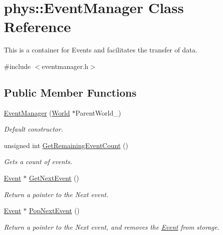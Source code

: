 \hypertarget{classphys_1_1EventManager}{
\section{phys::EventManager Class Reference}
\label{da/dde/classphys_1_1EventManager}
}


This is a container for Events and facilitates the transfer of data.  




{\ttfamily \#include $<$eventmanager.h$>$}

\subsection*{Public Member Functions}
\begin{DoxyCompactItemize}
\item 
\hyperlink{classphys_1_1EventManager_a148f8c559642d3d50206169b3d0406be}{EventManager} (\hyperlink{classphys_1_1World}{World} $\ast$ParentWorld\_\-)
\begin{DoxyCompactList}\small\item\em Default constructor. \item\end{DoxyCompactList}\item 
unsigned int \hyperlink{classphys_1_1EventManager_a67b755e3fe888e1305312d0f966f4a06}{GetRemainingEventCount} ()
\begin{DoxyCompactList}\small\item\em Gets a count of events. \item\end{DoxyCompactList}\item 
\hyperlink{classphys_1_1Event}{Event} $\ast$ \hyperlink{classphys_1_1EventManager_a4c11830094d6566fd5db87dfbe6b5dd0}{GetNextEvent} ()
\begin{DoxyCompactList}\small\item\em Return a pointer to the Next event. \item\end{DoxyCompactList}\item 
\hyperlink{classphys_1_1Event}{Event} $\ast$ \hyperlink{classphys_1_1EventManager_ac4f0c084cadd712233914c96fffdb2d5}{PopNextEvent} ()
\begin{DoxyCompactList}\small\item\em Return a pointer to the Next event, and removes the \hyperlink{classphys_1_1Event}{Event} from storage. \item\end{DoxyCompactList}\item 

\end{DoxyCompactItemize}
